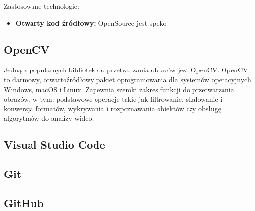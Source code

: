 Zastosowane technologie:

\begin{itemize}
    \item \textbf{Otwarty kod źródłowy:} OpenSource jest spoko
    
\end{itemize}


\subsection{OpenCV}
Jedną z popularnych bibliotek do przetwarzania obrazów jest OpenCV. 
OpenCV to darmowy, otwartoźródłowy pakiet oprogramowania dla systemów operacyjnych Windows, macOS i Linux. 
Zapewnia szeroki zakres funkcji do przetwarzania obrazów, w tym: podstawowe operacje takie jak filtrowanie, skalowanie i konwersja formatów, wykrywania i rozpoznawania obiektów czy obsługę algorytmów do analizy wideo.
\subsection{Visual Studio Code}
\subsection{Git}
\subsection{GitHub}